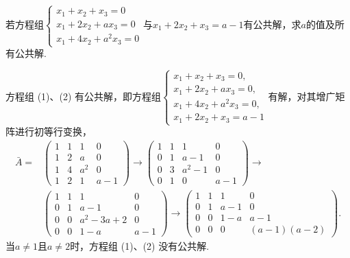 \begin{exercise}
\begin{exgroup}
        \item 若方程组$\begin{cases}
                x_1+x_2+x_3=0   \\
                x_1+2x_2+ax_3=0 \\
                x_1+4x_2+a^2x_3=0
            \end{cases}$与$x_1+2x_2+x_3=a-1$有公共解，求$a$的值及所有公共解.
        \begin{answer}
            方程组 (1)、(2) 有公共解，即方程组$\begin{cases}
                x_1+x_2+x_3=0,     \\
                x_1+2x_2+ax_3=0,   \\
                x_1+4x_2+a^2x_3=0, \\
                x_1+2x_2+x_3=a-1
            \end{cases}$有解，对其增广矩阵进行初等行变换，
        \begin{align*}
            \bar{A}= & \begin{pmatrix}
                           1 & 1 & 1   & 0   \\
                           1 & 2 & a   & 0   \\
                           1 & 4 & a^2 & 0   \\
                           1 & 2 & 1   & a-1
                       \end{pmatrix}\rightarrow
            \begin{pmatrix}
                1 & 1 & 1     & 0   \\
                0 & 1 & a-1   & 0   \\
                0 & 3 & a^2-1 & 0   \\
                0 & 1 & 0     & a-1
            \end{pmatrix}\rightarrow            \\
                     & \begin{pmatrix}
                           1 & 1 & 1        & 0   \\
                           0 & 1 & a-1      & 0   \\
                           0 & 0 & a^2-3a+2 & 0   \\
                           0 & 0 & 1-a      & a-1
                       \end{pmatrix}\rightarrow
            \begin{pmatrix}
                1 & 1 & 1   & 0          \\
                0 & 1 & a-1 & 0          \\
                0 & 0 & 1-a & a-1        \\
                0 & 0 & 0   & (a-1)(a-2)
            \end{pmatrix}.
        \end{align*}
        当$a\neq 1$且$a\neq 2$时，方程组 (1)、(2) 没有公共解.


\end{answer}
\end{exgroup}
\end{exercise}
